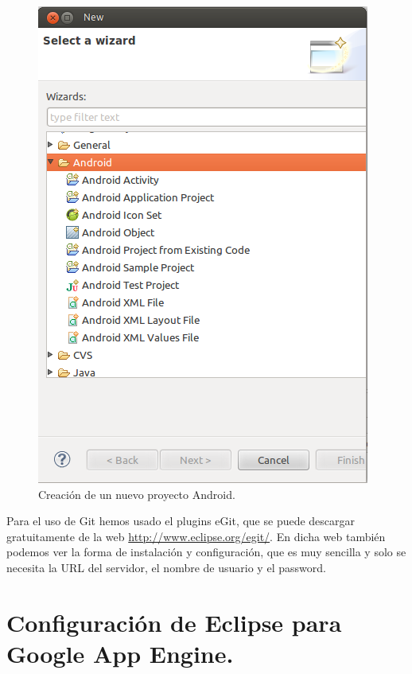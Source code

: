 \begin{figure}
  \centering
    \includegraphics[scale=0.6]{./ConfiguracionEclipse/imagenes/nuevoProyectoAndroid.png}
  \caption{Creación de un nuevo proyecto Android.}
  \label{fig:nuevoProyectoAndroid}
\end{figure}

Para el uso de Git hemos usado el plugins eGit, que se puede descargar gratuitamente de la web \url{http://www.eclipse.org/egit/}. En dicha web también podemos ver la forma de instalación y configuración, que es muy sencilla y solo se necesita la URL del servidor, el nombre de usuario y el password.

\section{Configuración de Eclipse para Google App Engine.}

